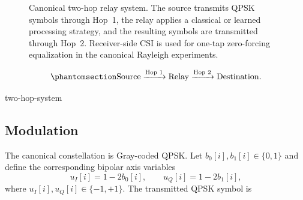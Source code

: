 \begin{figure}[htbp]
\centering
{}
\caption[Two-hop relay system model]
{Canonical two-hop relay system. The source transmits QPSK symbols
through Hop~1, the relay applies a classical or learned processing
strategy, and the resulting symbols are transmitted through Hop~2.
Receiver-side CSI is used for one-tap zero-forcing equalization in the
canonical Rayleigh experiments.}
\label{fig:relay-system-simple}
\end{figure}

\begin{equation}\protect\phantomsection\label{eq:two-hop-system}
\text{Source}
\xrightarrow{\text{Hop 1}}
\text{Relay}
\xrightarrow{\text{Hop 2}}
\text{Destination}.
\end{equation}
{\protect\numberline{\theequation}\quad two-hop-system}


\subsection{Modulation}\label{sec:modulation}

The canonical constellation is Gray-coded QPSK. Let
$b_0[i],b_1[i]\in\{0,1\}$ and define the corresponding bipolar axis
variables
\[
u_I[i]=1-2b_0[i],
\qquad
u_Q[i]=1-2b_1[i],
\]
where $u_I[i],u_Q[i]\in\{-1,+1\}$. The transmitted QPSK symbol is

